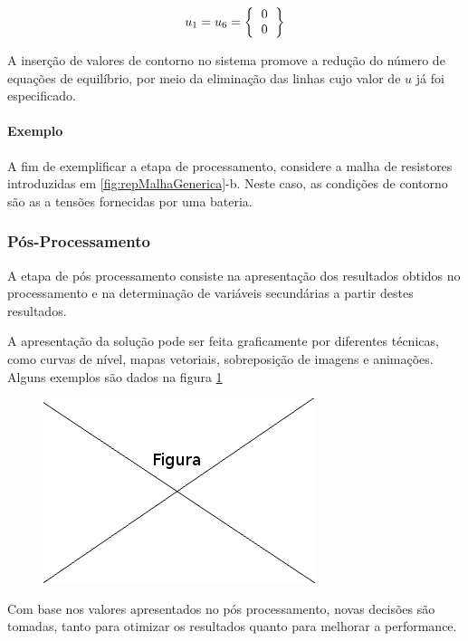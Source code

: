 \begin{equation}
   	\label{eq:condIni}
 	u_1 = u_6 = 
		\left \{
 		\begin{tabular}{c}
	 		$0$ \\
	 		$0$ \\
  		\end{tabular} 		
		\right \}	
\end{equation}

A inserção de valores de contorno no sistema promove a redução do número de equações de equilíbrio, por meio da eliminação das linhas cujo valor de $u$ já foi especificado.

\paragraph{Exemplo \\}

A fim de exemplificar a etapa de processamento,  considere a malha de resistores introduzidas  em \ref{fig:repMalhaGenerica}-b. Neste caso, as condições de contorno são as a tensões fornecidas por uma bateria.

\subsubsection{Pós-Processamento}
A etapa de pós processamento consiste na apresentação dos resultados obtidos no processamento e na determinação de variáveis secundárias a partir destes resultados.

A apresentação da solução pode ser feita graficamente por diferentes técnicas, como curvas de nível, mapas vetoriais, sobreposição de imagens e animações. Alguns exemplos são dados na figura \ref{fig:graf}

\begin{figure}[!htb]
\centering
\includegraphics[scale=0.5]{figuras/temp.png}
\caption{}
\label{fig:graf}
\end{figure}

Com base nos valores apresentados no pós processamento, novas decisões são tomadas, tanto para otimizar os resultados quanto para melhorar a performance.

